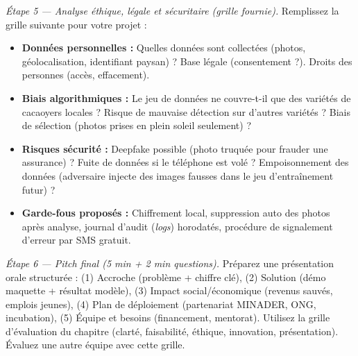\documentclass[11pt]{article}
\begin{document}
\emph{Étape 5 — Analyse éthique, légale et sécuritaire (grille fournie).} Remplissez la grille suivante pour votre projet :
\begin{itemize}
    \item \textbf{Données personnelles :} Quelles données sont collectées (photos, géolocalisation, identifiant paysan) ? Base légale (consentement ?). Droits des personnes (accès, effacement).
    \item \textbf{Biais algorithmiques :} Le jeu de données ne couvre-t-il que des variétés de cacaoyers locales ? Risque de mauvaise détection sur d'autres variétés ? Biais de sélection (photos prises en plein soleil seulement) ?
    \item \textbf{Risques sécurité :} Deepfake possible (photo truquée pour frauder une assurance) ? Fuite de données si le téléphone est volé ? Empoisonnement des données (adversaire injecte des images fausses dans le jeu d'entraînement futur) ?
    \item \textbf{Garde-fous proposés :} Chiffrement local, suppression auto des photos après analyse, journal d'audit (\emph{logs}) horodatés, procédure de signalement d'erreur par SMS gratuit.
\end{itemize}

\emph{Étape 6 — Pitch final (5 min + 2 min questions).} Préparez une présentation orale structurée : (1) Accroche (problème + chiffre clé), (2) Solution (démo maquette + résultat modèle), (3) Impact social/économique (revenus sauvés, emplois jeunes), (4) Plan de déploiement (partenariat MINADER, ONG, incubation), (5) Équipe et besoins (financement, mentorat). Utilisez la grille d'évaluation du chapitre (clarté, faisabilité, éthique, innovation, présentation). Évaluez une autre équipe avec cette grille.
\end{document}
